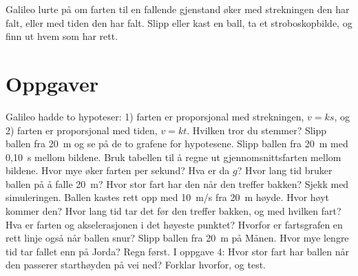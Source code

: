 \documentclass[11pt]{article}
\begin{document}

Galileo lurte på om farten til en fallende gjenstand øker med strekningen den har falt, eller med tiden den har falt. Slipp eller kast en ball, ta et stroboskopbilde, og finn ut hvem som har rett.

\section*{Oppgaver}

\begin{oppgaveliste}
\oppgave {}Galileo hadde to hypoteser: 1) farten er proporsjonal med strekningen, $v = ks$, og 2) farten er proporsjonal med tiden, $v = kt$. Hvilken tror du stemmer? Slipp ballen fra 20~m og se på de to grafene for hypotesene.
\svar
\oppgave {}Slipp ballen fra 20~m med 0,10~s mellom bildene. Bruk tabellen til å regne ut gjennomsnittsfarten mellom bildene. Hvor mye øker farten per sekund? Hva er da $g$?
\svar
\oppgave {}Hvor lang tid bruker ballen på å falle 20~m? Hvor stor fart har den når den treffer bakken? Sjekk med simuleringen.
\svar
\oppgave {}Ballen kastes rett opp med 10~m/s fra 20~m høyde. Hvor høyt kommer den? Hvor lang tid tar det før den treffer bakken, og med hvilken fart?
\svar
\oppgave {}Hva er farten og akselerasjonen i det høyeste punktet? Hvorfor er fartsgrafen en rett linje også når ballen snur?
\svar
\oppgave {}Slipp ballen fra 20~m på Månen. Hvor mye lengre tid tar fallet enn på Jorda? Regn først.
\svar
\oppgave {}I oppgave 4: Hvor stor fart har ballen når den passerer starthøyden på vei ned? Forklar hvorfor, og test.
\svar
\end{oppgaveliste}
\end{document}
